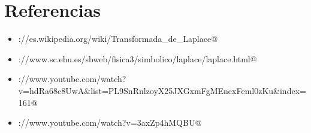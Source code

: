 \documentclass[12pt,a4paper,twoside,onecolumn,openany]{book}
\begin{document}
\chapter{Referencias}
\begin{itemize}
\item \verb@https://es.wikipedia.org/wiki/Transformada_de_Laplace@
\item \verb@http://www.sc.ehu.es/sbweb/fisica3/simbolico/laplace/laplace.html@
\item \verb@https://www.youtube.com/watch?v=hdRa68c8UwA&list=PL9SnRnlzoyX25JXGxmFgMEnexFeml0zKu&index=161@
\item \verb@https://www.youtube.com/watch?v=3axZp4hMQBU@
\end{itemize}
\end{document}
